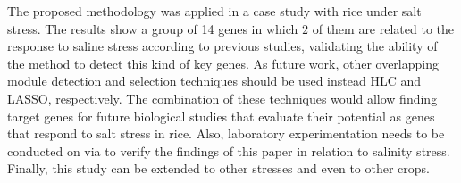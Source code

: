 The proposed methodology was applied in a case study with rice under salt
stress. The results show a group of 14 genes in which $2$ of them are
related to the response to saline stress according to previous
studies, validating the ability of the method to detect this kind of
key genes. As future work, other overlapping module detection and selection
techniques should be used instead HLC and LASSO, respectively. The
combination of these techniques would allow finding target genes for
future biological studies that evaluate their potential as genes that
respond to salt stress in rice. Also, laboratory experimentation needs to be
conducted on via to verify the findings of this paper in relation to salinity 
stress. Finally, this study can be extended to other stresses and even to other 
crops.
